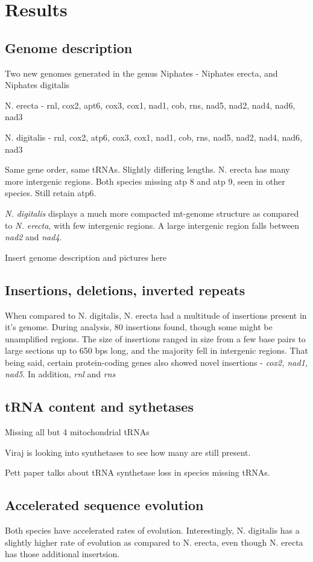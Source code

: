 \documentclass[../main.tex]{subfiles}
\begin{document}
\section{Results}

\subsection{Genome description}
Two new genomes generated in the genus Niphates - Niphates erecta, and Niphates digitalis

N. erecta - rnl, cox2, apt6, cox3, cox1, nad1, cob, rns, nad5, nad2, nad4, nad6, nad3

N. digitalis - rnl, cox2, atp6, cox3, cox1, nad1, cob, rns, nad5, nad2, nad4, nad6, nad3

Same gene order, same tRNAs. Slightly differing lengths. N. erecta has many more intergenic regions. Both species missing atp 8 and atp 9, seen in other species. Still retain atp6. 

\emph{N. digitalis} displays a much more compacted mt-genome structure as compared to \emph{N. erecta}, with few intergenic regions. A large intergenic region falls between \emph{nad2} and \emph{nad4}.

Insert genome description and pictures here

\subsection{Insertions, deletions, inverted repeats}
When compared to N. digitalis, N. erecta had a multitude of insertions present in it's genome. During analysis, 80 insertions found, though some might be unamplified regions. The size of insertions ranged in size from a few base pairs to large sections up to 650 bps long, and the majority fell in intergenic regions. That being said, certain protein-coding genes also showed novel insertions - \emph{cox2, nad1, nad5}. In addition, \emph{rnl} and \emph{rns}

\subsection{tRNA content and sythetases}
Missing all but 4 mitochondrial tRNAs

Viraj is looking into synthetases to see how many are still present.

Pett paper talks about tRNA synthetase loss in species missing tRNAs. 

\subsection{Accelerated sequence evolution}
Both species have accelerated rates of evolution. Interestingly, N. digitalis has a slightly higher rate of evolution as compared to N. erecta, even though N. erecta has those additional insertsion.
\end{document}
